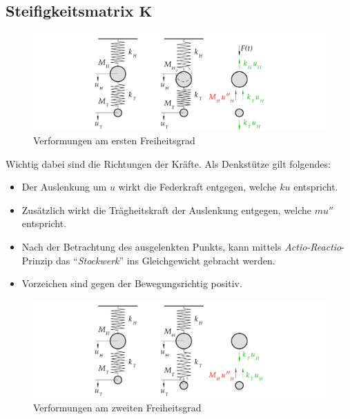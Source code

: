 \documentclass[
  letterpaper,
  DIV=11]{scrreprt}
\providecommand{\tightlist}{%
  \setlength{\itemsep}{0pt}\setlength{\parskip}{0pt}}\usepackage{longtable,booktabs,array}
\begin{document}
\hypertarget{steifigkeitsmatrix-mathbfk}{%
\subsection{\texorpdfstring{Steifigkeitsmatrix
\(\mathbf{K}\)}{Steifigkeitsmatrix \textbackslash mathbf\{K\}}}\label{steifigkeitsmatrix-mathbfk}}

\begin{figure}[H]

{\centering \includegraphics{index_files/mediabag/bilder/aufgabe_mms_tilg_auslenk2.pdf}

}

\caption{\label{fig-mms_tilg_auslenkung_1}Verformungen am ersten
Freiheitsgrad}

\end{figure}

Wichtig dabei sind die Richtungen der Kräfte. Als Denkstütze gilt
folgendes:

\begin{itemize}
\tightlist
\item
  Der Auslenkung um \(u\) wirkt die Federkraft entgegen, welche \(k u\)
  entspricht.
\item
  Zusätzlich wirkt die Trägheitskraft der Auslenkung entgegen, welche
  \(m u''\) entspricht.
\item
  Nach der Betrachtung des ausgelenkten Punkts, kann mittels
  \emph{Actio-Reactio}-Prinzip das ``\emph{Stockwerk}'' ins
  Gleichgewicht gebracht werden.
\item
  Vorzeichen sind gegen der Bewegungsrichtig positiv.
\end{itemize}

\begin{figure}[H]

{\centering \includegraphics{index_files/mediabag/bilder/aufgabe_mms_tilg_auslenk1.pdf}

}

\caption{\label{fig-mms_tilg_auslenkung_2}Verformungen am zweiten
Freiheitsgrad}

\end{figure}
\end{document}
